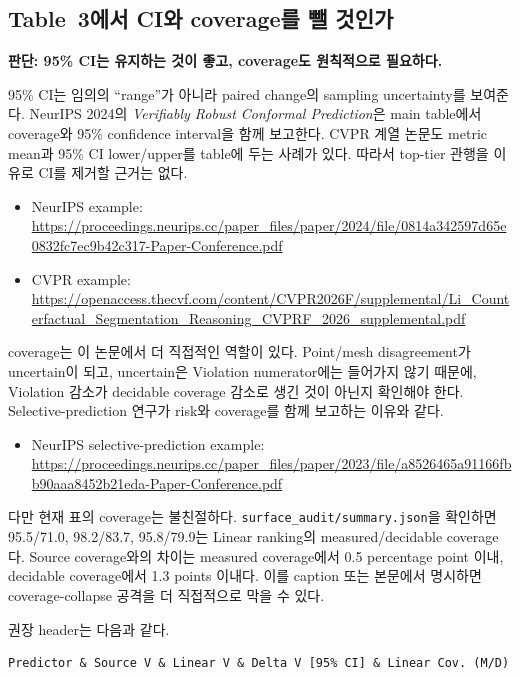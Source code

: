 \documentclass[11pt]{article}
\newcommand{\fileline}[1]{\texttt{#1}}
\begin{document}
\subsection{Table~3에서 CI와 coverage를 뺄 것인가}

\textbf{판단: 95\% CI는 유지하는 것이 좋고, coverage도 원칙적으로 필요하다.}

95\% CI는 임의의 ``range''가 아니라 paired change의 sampling uncertainty를 보여준다.
NeurIPS 2024의 \emph{Verifiably Robust Conformal Prediction}은 main table에서
coverage와 95\% confidence interval을 함께 보고한다. CVPR 계열 논문도 metric
mean과 95\% CI lower/upper를 table에 두는 사례가 있다. 따라서 top-tier 관행을
이유로 CI를 제거할 근거는 없다.

\begin{itemize}[leftmargin=2em]
    \item NeurIPS example:
    \url{https://proceedings.neurips.cc/paper_files/paper/2024/file/0814a342597d65e0832fc7ec9b42c317-Paper-Conference.pdf}
    \item CVPR example:
    \url{https://openaccess.thecvf.com/content/CVPR2026F/supplemental/Li_Counterfactual_Segmentation_Reasoning_CVPRF_2026_supplemental.pdf}
\end{itemize}

coverage는 이 논문에서 더 직접적인 역할이 있다. Point/mesh disagreement가 uncertain이
되고, uncertain은 Violation numerator에는 들어가지 않기 때문에, Violation 감소가
decidable coverage 감소로 생긴 것이 아닌지 확인해야 한다. Selective-prediction
연구가 risk와 coverage를 함께 보고하는 이유와 같다.

\begin{itemize}[leftmargin=2em]
    \item NeurIPS selective-prediction example:
    \url{https://proceedings.neurips.cc/paper_files/paper/2023/file/a8526465a91166fbb90aaa8452b21eda-Paper-Conference.pdf}
\end{itemize}

다만 현재 표의 coverage는 불친절하다. \fileline{surface_audit/summary.json}을
확인하면 95.5/71.0, 98.2/83.7, 95.8/79.9는 Linear ranking의 measured/decidable
coverage다. Source coverage와의 차이는 measured coverage에서 0.5 percentage
point 이내, decidable coverage에서 1.3 points 이내다. 이를 caption 또는 본문에서
명시하면 coverage-collapse 공격을 더 직접적으로 막을 수 있다.

권장 header는 다음과 같다.

\begin{verbatim}
Predictor & Source V & Linear V & Delta V [95% CI] & Linear Cov. (M/D)
\end{verbatim}
\end{document}
